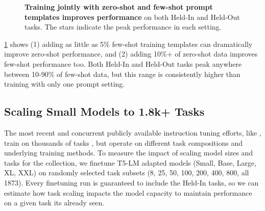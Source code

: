 \begin{figure}[ht]
\begin{centering}
    \caption{
    \textbf{Training jointly with zero-shot and few-shot prompt templates improves performance} on both Held-In and Held-Out tasks.
    The stars indicate the peak performance in each setting.
    } 
    \label{fig:zero-few-shot}
    \end{centering}
\end{figure}

\cref{fig:zero-few-shot} shows (1) adding as little as 5\% few-shot training templates can dramatically improve zero-shot performance, and (2) adding 10\%+ of zero-shot data improves few-shot performance too.
Both Held-In and Held-Out tasks peak anywhere between 10-90\% of few-shot data, but this range is consistently higher than training with only one prompt setting.

\subsection{Scaling Small Models to 1.8k+ Tasks}
\label{sec:mtft-scaling}

The most recent and concurrent publicly available instruction tuning efforts, like \flantwo{}, train on thousands of tasks \citep{wang2022benchmarking,iyer2022optiml}, but operate on different task compositions and underlying training methods.
To measure the impact of scaling model sizes and tasks for the  \flantwo{} collection, we finetune T5-LM adapted models (Small, Base, Large, XL, XXL) on randomly selected task subsets (8, 25, 50, 100, 200, 400, 800, all 1873). 
Every finetuning run is guaranteed to include the Held-In tasks, so we can estimate how task scaling impacts the model capacity to maintain performance on a given task its already seen.

